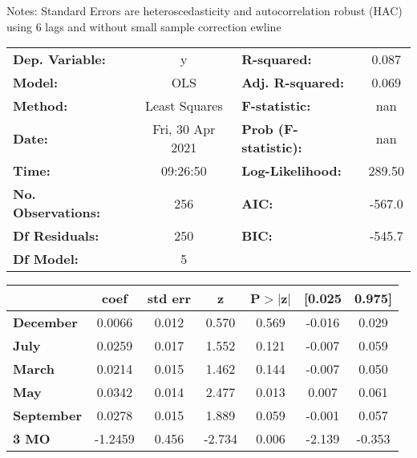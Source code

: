 Notes: \newline
 [1] Standard Errors are heteroscedasticity and autocorrelation robust (HAC) using 6 lags and without small sample correction
ewline\begin{center}
\begin{tabular}{lclc}
\toprule
\textbf{Dep. Variable:}    &        y         & \textbf{  R-squared:         } &     0.087   \\
\textbf{Model:}            &       OLS        & \textbf{  Adj. R-squared:    } &     0.069   \\
\textbf{Method:}           &  Least Squares   & \textbf{  F-statistic:       } &       nan   \\
\textbf{Date:}             & Fri, 30 Apr 2021 & \textbf{  Prob (F-statistic):} &      nan    \\
\textbf{Time:}             &     09:26:50     & \textbf{  Log-Likelihood:    } &    289.50   \\
\textbf{No. Observations:} &         256      & \textbf{  AIC:               } &    -567.0   \\
\textbf{Df Residuals:}     &         250      & \textbf{  BIC:               } &    -545.7   \\
\textbf{Df Model:}         &           5      & \textbf{                     } &             \\
\bottomrule
\end{tabular}
\begin{tabular}{lcccccc}
                   & \textbf{coef} & \textbf{std err} & \textbf{z} & \textbf{P$> |$z$|$} & \textbf{[0.025} & \textbf{0.975]}  \\
\midrule
\textbf{December}  &       0.0066  &        0.012     &     0.570  &         0.569        &       -0.016    &        0.029     \\
\textbf{July}      &       0.0259  &        0.017     &     1.552  &         0.121        &       -0.007    &        0.059     \\
\textbf{March}     &       0.0214  &        0.015     &     1.462  &         0.144        &       -0.007    &        0.050     \\
\textbf{May}       &       0.0342  &        0.014     &     2.477  &         0.013        &        0.007    &        0.061     \\
\textbf{September} &       0.0278  &        0.015     &     1.889  &         0.059        &       -0.001    &        0.057     \\
\textbf{3 MO}      &      -1.2459  &        0.456     &    -2.734  &         0.006        &       -2.139    &       -0.353     \\

\end{tabular}
\end{center}
